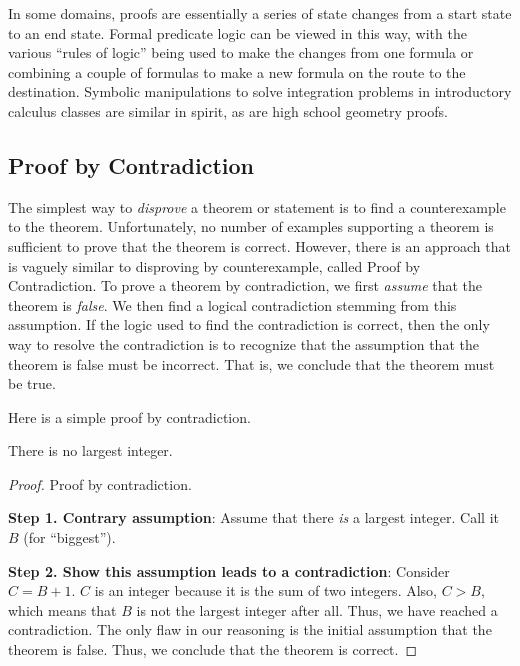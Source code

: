 In some domains, proofs are essentially a series of state changes from
a start state to an end state.
Formal predicate logic can be viewed in this way, with the various
``rules of logic'' being used to make the changes from one formula or
combining a couple of formulas to make a new formula
on the route to the destination.
Symbolic manipulations to solve integration problems in introductory
calculus classes are similar in spirit, as are high school geometry
proofs.

\subsection{Proof by Contradiction}

The simplest way to \emph{disprove} a theorem or statement is to find
a counter\-example to the theorem.
Unfortunately, no number of examples supporting a theorem is
sufficient to prove that the theorem is correct.
However, there is an approach that is vaguely similar to disproving by
counter\-example, called Proof by Contradiction.
To prove a theorem by contradiction, we first \emph{assume} that the
theorem is \emph{false}.
We then find a logical contradiction stemming from this assumption.
If the logic used to find the contradiction is correct, then the only
way to resolve the contradiction is to recognize that the assumption
that the theorem is false must be incorrect.
That is, we conclude that the theorem must be true.

\begin{example}
Here is a simple proof by contradiction.
\medskip

\begin{theorem}
There is no largest integer.
\end{theorem}

\begin{proof}
Proof by contradiction.

\textbf{Step 1. Contrary assumption}: Assume that there \emph{is} a
largest integer.
Call it \(B\) (for ``biggest'').

\textbf{Step 2. Show this assumption leads to a contradiction}:
Consider \(C = B + 1\).
\(C\) is an integer because it is the sum of two integers.
Also, \(C > B\), which means that \(B\) is not the
largest integer after all.
Thus, we have reached a contradiction.
The only flaw in our reasoning is the initial assumption that
the theorem is false.
Thus, we conclude that the theorem is
correct.
\end{proof}
\end{example}

